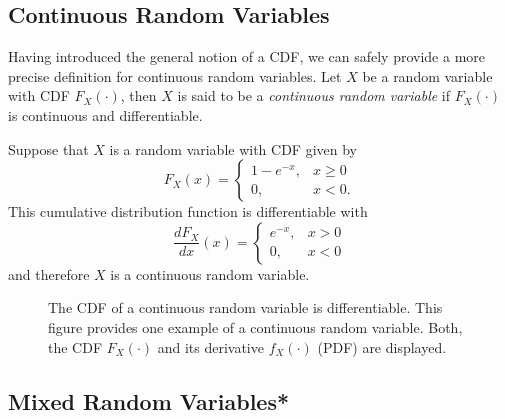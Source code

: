 \subsection{Continuous Random Variables}

Having introduced the general notion of a CDF, we can safely provide a more precise definition for continuous random variables.
Let $X$ be a random variable with CDF $F_X (\cdot)$, then $X$ is said to be a \emph{continuous random variable} if $F_X (\cdot)$ is continuous and differentiable. 

\begin{example}
Suppose that $X$ is a random variable with CDF given by
\begin{equation*}
F_X(x) = \begin{cases} 1 - e^{-x}, & x \geq 0 \\
0, & x < 0 . \end{cases}
\end{equation*}
This cumulative distribution function is differentiable with
\begin{equation*}
\frac{dF_X}{dx}(x)
= \begin{cases} e^{-x}, & x > 0 \\
0, & x < 0 \end{cases}
\end{equation*}
and therefore $X$ is a continuous random variable.
\end{example}

\begin{figure}[ht]
\begin{center}
\end{center}
\caption{The CDF of a continuous random variable is differentiable.
This figure provides one example of a continuous random variable.
Both, the CDF $F_X(\cdot)$ and its derivative $f_X(\cdot)$ (PDF) are displayed.}
\end{figure}


\subsection{Mixed Random Variables*}

